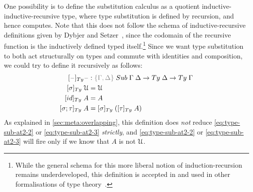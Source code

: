 \documentclass[a4paper,UKenglish,numberwithinsect,cleveref,thm-restate]{lipics-v2021}
\begin{document}
One possibility is to define the substitution calculus as a quotient inductive-inductive-recursive type, where type substitution is defined by recursion, and hence computes.
Note that this does not follow the schema of inductive-recursive definitions given by Dybjer and Setzer~\cite{Dybjer2000,Dybjer2003}, since the codomain of the recursive function is the inductively defined typed itself.\footnote{%
  While the general schema for this more liberal notion of induction-recursion remains underdeveloped, this definition is accepted in \Agda and used in other formalisations of type theory~\cite{Danielsson2006}.}
%
Since we want type substitution to both act structurally on types and commute with identities and composition, we could try to define it recursively as follows:
\begin{alignat}{3}
[\blank]_{\Ty} \blank &: \implicit{\Gamma, \Delta} \; \Sub\;\Gamma\;\Delta \to \Ty\;\Delta \to \Ty\;\Gamma \nonumber \\
[ \sigma ]_{\Ty}       \;\UU  & = \UU                                   \label{eq:type-sub-at2-1} \\
[ \idS ]_{\Ty}         \;A    & = A                                     \label{eq:type-sub-at2-2} \\
[ \sigma ; \tau ]_{\Ty}\;A    & = [ \sigma ]_{\Ty}\;([ \tau ]_{\Ty}\;A) \label{eq:type-sub-at2-3}
\end{alignat}
As explained in \cref{sec:meta:overlapping}, this definition does \emph{not} reduce \eqref{eq:type-sub-at2-2} or \eqref{eq:type-sub-at2-3} \emph{strictly}, and \eqref{eq:type-sub-at2-2} or \eqref{eq:type-sub-at2-3} will fire only if we know that $A$ is not $\mathcal{U}$.
\end{document}
